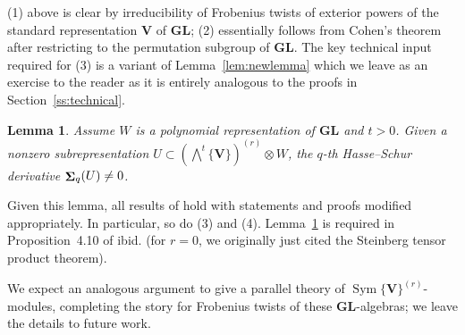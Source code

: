 \documentclass[12pt]{amsart}
\newcommand{\bV}{\mathbf{V}}
\newcommand{\lw}{{\textstyle \bigwedge}}
\DeclareMathOperator{\Sym}{Sym}
\DeclareMathOperator{\Sh}{\bf{\Sigma}}
\newcommand{\mShq}{\Sh_{q}}
\newcommand{\GL}{\mathbf{GL}}
\numberwithin{equation}{section}
\newtheorem{lemma}[equation]{Lemma}
\theoremstyle{definition}
\theoremstyle{plain}
\begin{document}
(1) above is clear by irreducibility of Frobenius twists of exterior powers of the standard representation $\bV$ of $\GL$; (2) essentially follows from Cohen's theorem after restricting to the permutation subgroup of $\GL$.  The key technical input required for (3) is a variant of Lemma~\ref{lem:newlemma} which we leave as an exercise to the reader as it is entirely analogous to the proofs in Section~\ref{ss:technical}.
\begin{lemma}\label{lem:Rnew}
    Assume $W$ is a polynomial representation of $\GL$ and $t > 0$. Given a nonzero subrepresentation $U \subset (\lw^t\{\bV\})^{(r)} \otimes W$, the $q$-th Hasse--Schur derivative $\mShq(U) \ne 0$. 
\end{lemma}
Given this lemma, all results of \cite{gan22ext} hold with statements and proofs modified appropriately. In particular, so do (3) and (4). Lemma~\ref{lem:Rnew} is required in Proposition~4.10 of ibid. (for $r = 0$, we originally just cited the Steinberg tensor product theorem).

We expect an analogous argument to give a parallel theory of $\Sym\{\bV\}^{(r)}$-modules, completing the story for Frobenius twists of these $\GL$-algebras; we leave the details to future work. 


\end{document}
